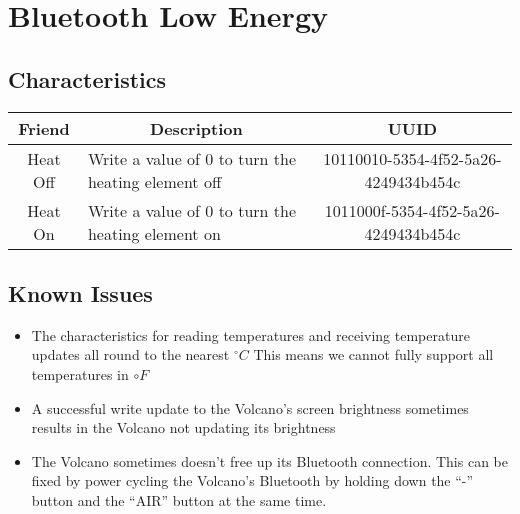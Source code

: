 \chapter{Bluetooth Low Energy}
\section{Characteristics}
\begin{tabular}{c|p{2.3in}|c}
\textbf{Friend} & \multicolumn{1}{|c|}{\textbf{Description}} & \textbf{UUID} \\ \hline
Heat Off & Write a value of 0 to turn the heating element off & 10110010-5354-4f52-5a26-4249434b454c \\ \hline
Heat On & Write a value of 0 to turn the heating element on & 1011000f-5354-4f52-5a26-4249434b454c \\ \hline

\end{tabular}
\section{Known Issues}
\begin{itemize}
    \item The characteristics for reading temperatures and receiving temperature updates all round to the nearest $^\circ C$
        \subitem This means we cannot fully support all temperatures in $\circ F$
    \item A successful write update to the Volcano's screen brightness sometimes results in the Volcano not updating its brightness
    \item The Volcano sometimes doesn't free up its Bluetooth connection. This can be fixed by power cycling the Volcano's Bluetooth by holding down the ``-'' button and the ``AIR'' button at the same time.
\end{itemize}

